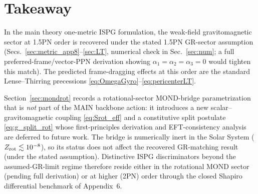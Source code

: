 \documentclass[11pt]{article}
\begin{document}
\section*{Takeaway}
In the main theory one-metric ISPG formulation, the weak-field gravitomagnetic sector at 1.5PN order is recovered under the stated 1.5PN GR-sector assumption (Secs.~\ref{sec:metric_app8}--\ref{sec:LT}, numerical check in Sec.~\ref{sec:num}; a full preferred-frame/vector-PPN derivation showing $\alpha_1=\alpha_2=\alpha_3=0$ would tighten this match). The predicted frame-dragging effects at this order are the standard Lense--Thirring precessions \eqref{eq:OmegaGyro}--\eqref{eq:pericenterLT}.

Section~\ref{sec:mondrot} records a rotational-sector MOND-bridge parametrization that is \emph{not} part of the MAIN backbone action: it introduces a new scalar--gravitomagnetic coupling \eqref{eq:Srot_eff} and a constitutive split postulate \eqref{eq:g_split_rot} whose first-principles derivation and EFT-consistency analysis are deferred to future work. The bridge is numerically inert in the Solar System ($Z_{\rm rot}\lesssim 10^{-8}$), so its status does not affect the recovered GR-matching result (under the stated assumption). Distinctive ISPG discriminators beyond the assumed-GR-limit regime therefore reside either in the rotational MOND sector (pending full derivation) or at higher (2PN) order through the closed Shapiro differential benchmark of Appendix~6.
\end{document}
